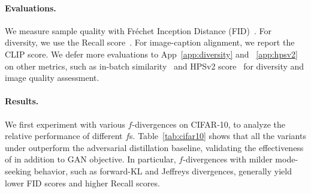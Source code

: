


\vspace{-10pt}
\paragraph{Evaluations.} We measure sample quality with Fr\'{e}chet Inception Distance (FID)~\citep{heusel2017gans}. For diversity, we use the Recall score~\cite{Kynknniemi2019ImprovedPA}. For image-caption alignment, we report the CLIP score. We defer more evaluations to App~\ref{app:diversity} and ~\ref{app:hpsv2} on other metrics, such as in-batch similarity~\cite{corso2023particle} and HPSv2 score~\cite{dao2025swiftbrush} for diversity and image quality assessment.


\vspace{-10pt}
\paragraph{Results.} We first experiment with various $f$-divergences on CIFAR-10, to analyze the relative performance of different $f$s. Table~\ref{tab:cifar10} shows that all the variants under \methodtext outperform the adversarial distillation baseline, validating the effectiveness of \methodtext in addition to GAN objective. In particular, $f$-divergences with milder mode-seeking behavior, such as forward-KL and Jeffreys divergences, generally yield lower FID scores and higher Recall scores. 



